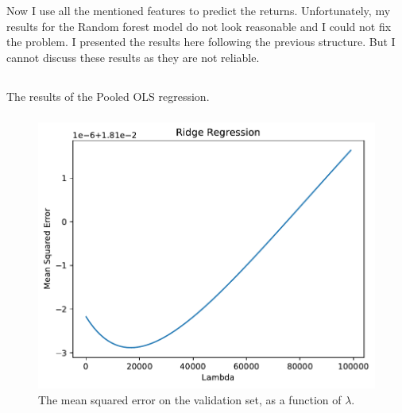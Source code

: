 \documentclass[hidelinks,12pt]{article}
\renewcommand{\thesubsection}{\thesection.\alph{subsection}}
\begin{document}
\section{}
Now I use all the mentioned features to predict the returns. Unfortunately, my results for the Random forest model do not look reasonable and I could not fix the problem. I presented the results here following the previous structure. But I cannot discuss these results as they are not reliable.
\renewcommand{\thesubsection}{\thesection.\arabic{subsection}}
\renewcommand{\thesubsubsection}{\thesubsection.\alph{subsubsection}}
\setcounter{subsection}{1}
\subsection{}
\subsubsection{}
\begin{table}[htbp]
    \centering
    \caption{The results of the Pooled OLS regression.}
    \resizebox{.9\textwidth}{!}{}
\end{table}
\FloatBarrier
\subsubsection{}
\begin{figure}[htbp]
    \centering
    \caption{The mean squared error on the validation set, as a function of $\lambda$.}
    \includegraphics[width=.95\textwidth]{out/6_2.pdf}
\end{figure}
\FloatBarrier
\end{document}
